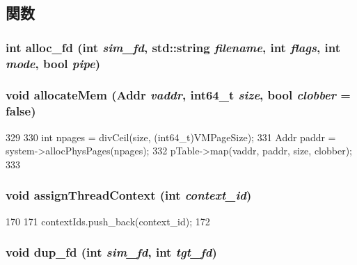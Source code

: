 \subsection{関数}
\hypertarget{classProcess_aa98d99fb9a7db11be09b4e5b818d1795}{
\subsubsection[{alloc\_\-fd}]{\setlength{\rightskip}{0pt plus 5cm}int alloc\_\-fd (int {\em sim\_\-fd}, \/  std::string {\em filename}, \/  int {\em flags}, \/  int {\em mode}, \/  bool {\em pipe})}}
\label{classProcess_aa98d99fb9a7db11be09b4e5b818d1795}
\hypertarget{classProcess_aaebf8af407502fcc035e598795f77089}{
\subsubsection[{allocateMem}]{\setlength{\rightskip}{0pt plus 5cm}void allocateMem ({\bf Addr} {\em vaddr}, \/  int64\_\-t {\em size}, \/  bool {\em clobber} = {\ttfamily false})}}
\label{classProcess_aaebf8af407502fcc035e598795f77089}



\begin{DoxyCode}
329 {
330     int npages = divCeil(size, (int64_t)VMPageSize);
331     Addr paddr = system->allocPhysPages(npages);
332     pTable->map(vaddr, paddr, size, clobber);
333 }
\end{DoxyCode}
\hypertarget{classProcess_aec797e960b8c534f9105fbd4ee83f2c7}{
\subsubsection[{assignThreadContext}]{\setlength{\rightskip}{0pt plus 5cm}void assignThreadContext (int {\em context\_\-id})}}
\label{classProcess_aec797e960b8c534f9105fbd4ee83f2c7}



\begin{DoxyCode}
170     {
171         contextIds.push_back(context_id);
172     }
\end{DoxyCode}
\hypertarget{classProcess_a292e48ab06f50224924454b6c74c90e4}{
\subsubsection[{dup\_\-fd}]{\setlength{\rightskip}{0pt plus 5cm}void dup\_\-fd (int {\em sim\_\-fd}, \/  int {\em tgt\_\-fd})}}
\label{classProcess_a292e48ab06f50224924454b6c74c90e4}



